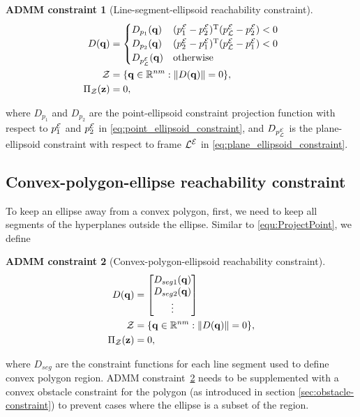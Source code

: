 \documentclass[journal]{IEEEtran}  %
\newtheorem{constraint}{ADMM constraint}
\def\sZ{\mathcal{Z}}
\begin{document}
\begin{constraint}[Line-segment-ellipsoid reachability constraint]
\begin{align}
D(\vq) &=  \begin{cases}
D_{p_{1}}(\vq) & (\Eframe{p_1}-\Eframe{p_2})\transpose (\Eframe{p_{\cL}}-\Eframe{p_2})<0\\
D_{p_{2}}(\vq) & (\Eframe{p_2}-\Eframe{p_1})\transpose (\Eframe{p_{\cL}} -\Eframe{p_1})<0\\
D_\Eframe{p_{\cL}}(\vq) & \textrm{otherwise}
\end{cases} \label{eq:segment_ellipsoid_constraint}\\
  \sZ &= \{\vq\in\mathbb{R}^{nm}:\norm{D(\vq)} = 0 \},\\
   \Pi_\sZ(\vz) & = 0, 
\end{align}
\end{constraint}
where $D_{p_{1}}$ and $D_{p_{2}}$ are the point-ellipsoid constraint projection function with respect to ${p_{1}^{\mathcal{E}}}$ and ${p_{2}^{\mathcal{E}}}$ in \eqref{eq:point_ellipsoid_constraint}, and $D_{p_{\mathcal{L}}^{\mathcal{E}}}$ is the plane-ellipsoid constraint with respect to frame ${\mathcal{L}^{\mathcal{E}}}$ in \eqref{eq:plane_ellipsoid_constraint}.


\subsection{Convex-polygon-ellipse reachability constraint}\label{sec:ellipse-region-constraint} 
To keep an ellipse away from a convex polygon, first, we need to keep all segments of the hyperplanes outside the ellipse. Similar to \eqref{equ:ProjectPoint}, we define
\begin{constraint}[Convex-polygon-ellipsoid reachability constraint]\label{constraint:polygon-ellipsoid}
\begin{align}
D(\vq) &= \bmat{D_{seg1}(\vq)\\D_{seg2}(\vq)\\ \vdots} \label{eq:region_ellipsoid_constraint}\\
  \sZ &= \{\vq\in\mathbb{R}^{nm}:\norm{D(\vq)} = 0 \},\\
   \Pi_\sZ(\vz) & = 0, 
\end{align}
\end{constraint}
where $D_{seg}$ are the constraint functions for each line segment used to define convex polygon region. ADMM constraint~\ref{constraint:polygon-ellipsoid} needs to be supplemented with a convex obstacle constraint for the polygon (as introduced in section \ref{sec:obstacle-constraint}) to prevent cases where the ellipse is a subset of the region.
\end{document}
